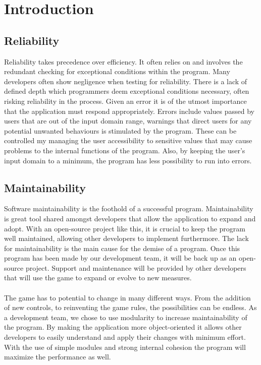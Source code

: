 \documentclass[12pt]{article}
\begin{document}
\newpage
\tableofcontents
\newpage


%
%

\section{Introduction}


\subsection{Reliability}
Reliability takes precedence over efficiency. It often relies on and involves the redundant checking for exceptional conditions within the program. Many developers often show negligence when testing for reliability. There is a lack of defined depth which programmers deem exceptional conditions necessary, often risking reliability in the process. Given an error it is of the utmost importance that the application must respond appropriately. Errors include values passed by users that are out of the input domain range, warnings that direct users for any potential unwanted behaviours is stimulated by the program. These can be controlled my managing the user accessibility to sensitive values that may cause problems to the internal functions of the program.  Also, by keeping the user’s input domain to a minimum, the program has less possibility to run into errors. 

\subsection{Maintainability}
Software maintainability is the foothold of a successful program. Maintainability is great tool shared amongst developers that allow the application to expand and adopt. With an open-source project like this, it is crucial to keep the program well maintained, allowing other developers to implement furthermore. The lack for maintainability is the main cause for the demise of a program. Once this program has been made by our development team, it will be back up as an open-source project. Support and maintenance will be provided by other developers that will use the game to expand or evolve to new measures.\\\\
The game has to potential to change in many different ways. From the addition of new controls, to reinventing the game rules, the possibilities can be endless. As a development team, we chose to use modularity to increase maintainability of the program. By making the application more object-oriented it allows other developers to easily understand and apply their changes with minimum effort. With the use of simple modules and strong internal cohesion the program will maximize the performance as well.
\end{document}
